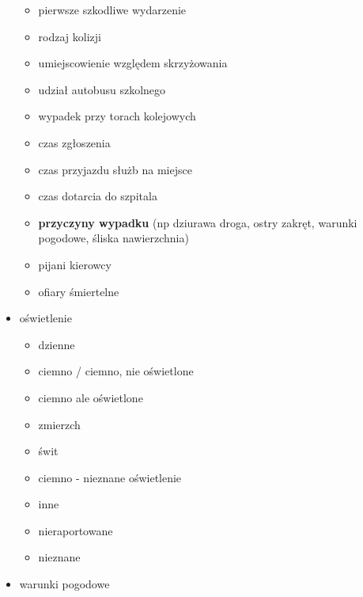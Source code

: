 \begin{itemize}
  \begin{itemize}
  \itemsep1pt\parskip0pt
  \item
    pierwsze szkodliwe wydarzenie\\
  \item
    rodzaj kolizji\\
  \item
    umiejscowienie względem skrzyżowania\\
  \item
    udział autobusu szkolnego\\
  \item
    wypadek przy torach kolejowych\\
  \item
    czas zgłoszenia\\
  \item
    czas przyjazdu służb na miejsce\\
  \item
    czas dotarcia do szpitala\\
  \item
    \textbf{przyczyny wypadku} (np dziurawa droga, ostry zakręt, warunki
    pogodowe, śliska nawierzchnia)\\
  \item
    pijani kierowcy\\
  \item
    ofiary śmiertelne\\
  \end{itemize}
\item
  oświetlenie

  \begin{itemize}
  \itemsep1pt\parskip0pt
  \item
    dzienne\\
  \item
    ciemno / ciemno, nie oświetlone\\
  \item
    ciemno ale oświetlone\\
  \item
    zmierzch\\
  \item
    świt\\
  \item
    ciemno - nieznane oświetlenie\\
  \item
    inne\\
  \item
    nieraportowane\\
  \item
    nieznane\\
  \end{itemize}
\item
  warunki pogodowe


\end{itemize}
